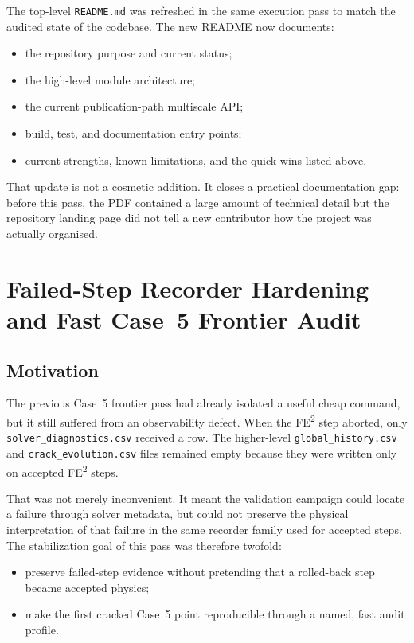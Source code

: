 The top-level \texttt{README.md} was refreshed in the same execution pass to
match the audited state of the codebase.  The new README now documents:
\begin{itemize}
  \item the repository purpose and current status;
  \item the high-level module architecture;
  \item the current publication-path multiscale API;
  \item build, test, and documentation entry points;
  \item current strengths, known limitations, and the quick wins listed above.
\end{itemize}
That update is not a cosmetic addition.  It closes a practical documentation
gap: before this pass, the PDF contained a large amount of technical detail but
the repository landing page did not tell a new contributor how the project was
actually organised.

\section{Failed-Step Recorder Hardening and Fast Case~5 Frontier Audit}
\label{sec:ms-stab-failed-step-frontier-audit}

\subsection{Motivation}

The previous Case~5 frontier pass had already isolated a useful cheap command,
but it still suffered from an observability defect.  When the
FE\textsuperscript{2} step aborted, only
\texttt{solver\_diagnostics.csv} received a row.  The higher-level
\texttt{global\_history.csv} and \texttt{crack\_evolution.csv} files remained
empty because they were written only on accepted FE\textsuperscript{2} steps.

That was not merely inconvenient.  It meant the validation campaign could
locate a failure through solver metadata, but could not preserve the physical
interpretation of that failure in the same recorder family used for accepted
steps.  The stabilization goal of this pass was therefore twofold:
\begin{itemize}
  \item preserve failed-step evidence without pretending that a rolled-back
    step became accepted physics;
  \item make the first cracked Case~5 point reproducible through a named,
    fast audit profile.
\end{itemize}

